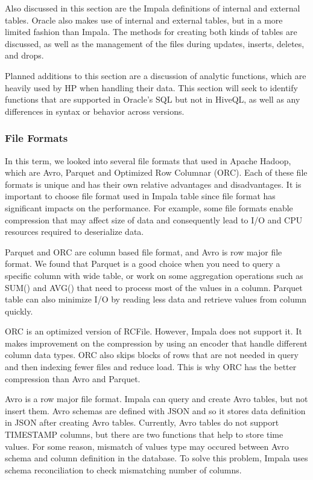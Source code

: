 \documentclass[onecolumn, draftclsnofoot,10pt, compsoc]{IEEEtran}
\begin{document}
Also discussed in this section are the Impala definitions of internal and external tables.
Oracle also makes use of internal and external tables, but in a more limited fashion than Impala.
The methods for creating both kinds of tables are discussed, as well as the management of the files during updates, inserts, deletes, and drops. 

Planned additions to this section are a discussion of analytic functions, which are heavily used by HP when handling their data.
This section will seek to identify functions that are supported in Oracle’s SQL but not in HiveQL, as well as any differences in syntax or behavior across versions. 

\subsubsection{File Formats}
In this term, we looked into several file formats that used in Apache Hadoop, which are Avro, Parquet and Optimized Row Columnar (ORC).
Each of these file formats is unique and has their own relative advantages and disadvantages.
It is important to choose file format used in Impala table since file format has significant impacts on the performance.
For example, some file formats enable compression that may affect size of data and consequently lead to I/O and CPU resources required to deserialize data.
 
Parquet and ORC are column based file format, and Avro is row major file format.
We found that Parquet is a good choice when you need to query a specific column with wide table, or work on some aggregation operations such as SUM() and AVG() that need to process most of the values in a column.
Parquet table can also minimize I/O by reading less data and retrieve values from column quickly.
 
ORC is an optimized version of RCFile.
However, Impala does not support it.
It makes improvement on the compression by using an encoder that handle different column data types.
ORC also skips blocks of rows that are not needed in query and then indexing fewer files and reduce load.
This is why ORC has the better compression than Avro and Parquet.
 
Avro is a row major file format.
Impala can query and create Avro tables, but not insert them. 
Avro schemas are defined with JSON and so it stores data definition in JSON after creating Avro tables. 
Currently, Avro tables do not support TIMESTAMP columns, but there are two functions that help to store time values. 
For some reason, mismatch of values type may occured between Avro schema and column definition in the database.
To solve this problem, Impala uses schema reconciliation to check mismatching number of columns.
\end{document}
